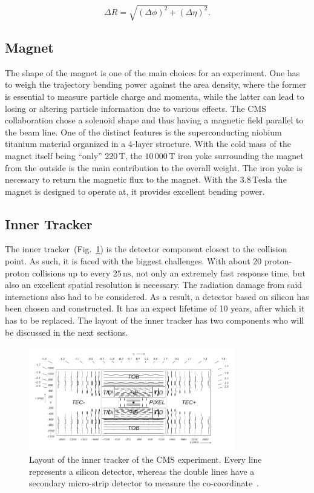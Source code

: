 \begin{equation}
  \label{eq:spatdiff}
  \Delta R = \sqrt{\left(\Delta \phi\right)^2 + \left(\Delta \eta\right)^2}.
\end{equation}

\subsection{Magnet}

The shape of the magnet is one of the main choices for an experiment. One has to weigh the trajectory bending power against the area density, where the former is essential to measure particle charge and momenta, while the latter can lead to losing or altering particle information due to various effects. The CMS collaboration chose a solenoid shape and thus having a magnetic field parallel to the beam line. One of the distinct features is the superconducting niobium titanium material organized in a 4-layer structure. With the cold mass of the magnet itself being ``only'' $220\,\text{T}$, the $10\,000\,\text{T}$ iron yoke surrounding the magnet from the outside is the main contribution to the overall weight. The iron yoke is necessary to return the magnetic flux to the magnet. With the $3.8\,\text{Tesla}$ the magnet is designed to operate at, it provides excellent bending power.

\subsection{Inner Tracker}
\label{sec:innertracker}

The inner tracker~(Fig.~\ref{fig:inntrk}) is the detector component closest to the collision point. As such, it is faced with the biggest challenges. With about 20 proton-proton collisions up to every $25\,\text{ns}$, not only an extremely fast response time, but also an excellent spatial resolution is necessary. The radiation damage from said interactions also had to be considered. As a result, a detector based on silicon has been chosen and constructed. It has an expect lifetime of 10 years, after which it has to be replaced. The layout of the inner tracker has two components who will be discussed in the next sections.

\begin{figure}[ht!]
  \centering
  \includegraphics[width=0.8\textwidth]{plots/innertracker.pdf}
  \caption{Layout of the inner tracker of the CMS experiment. Every line represents a silicon detector, whereas the double lines have a secondary micro-strip detector to measure the co-coordinate~\cite{cmsjinst}.}
  \label{fig:inntrk}
\end{figure}

